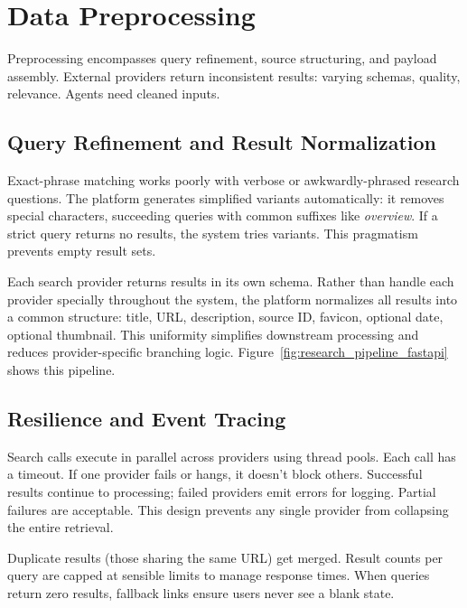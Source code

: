 \documentclass[12pt, a4paper]{article}
\begin{document}
\section{Data Preprocessing}

Preprocessing encompasses query refinement, source structuring, and payload assembly. External providers return inconsistent results: varying schemas, quality, relevance. Agents need cleaned inputs.

\subsection{Query Refinement and Result Normalization}

Exact-phrase matching works poorly with verbose or awkwardly-phrased research questions.
The platform generates simplified variants automatically: it removes special characters,
succeeding queries with common suffixes like \textit{overview}. If a strict query returns
no results, the system tries variants. This pragmatism prevents empty result sets.

Each search provider returns results in its own schema. Rather than handle each provider
specially throughout the system, the platform normalizes all results into a common structure:
title, URL, description, source ID, favicon, optional date, optional thumbnail. This
uniformity simplifies downstream processing and reduces provider-specific branching logic.
Figure~\ref{fig:research_pipeline_fastapi} shows this pipeline.

\subsection{Resilience and Event Tracing}

Search calls execute in parallel across providers using thread pools. Each call has a timeout.
If one provider fails or hangs, it doesn't block others. Successful results continue to
processing; failed providers emit errors for logging. Partial failures are acceptable. This
design prevents any single provider from collapsing the entire retrieval.

Duplicate results (those sharing the same URL) get merged. Result counts per query are capped
at sensible limits to manage response times. When queries return zero results, fallback links
ensure users never see a blank state.
\end{document}
